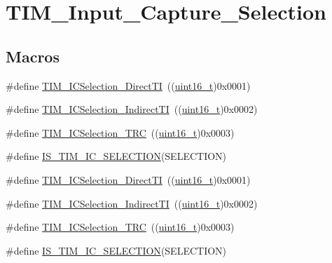 \hypertarget{group___t_i_m___input___capture___selection}{}\section{T\+I\+M\+\_\+\+Input\+\_\+\+Capture\+\_\+\+Selection}
\label{group___t_i_m___input___capture___selection}
\subsection*{Macros}
\begin{DoxyCompactItemize}
\item 
\#define \hyperlink{group___t_i_m___input___capture___selection_ga3d38876044457b7faefe951d367ac8c3}{T\+I\+M\+\_\+\+I\+C\+Selection\+\_\+\+Direct\+TI}~((\hyperlink{_p_e___types_8h_a1f1825b69244eb3ad2c7165ddc99c956}{uint16\+\_\+t})0x0001)
\item 
\#define \hyperlink{group___t_i_m___input___capture___selection_ga2289b684133ac0b81ddfcd860d01b144}{T\+I\+M\+\_\+\+I\+C\+Selection\+\_\+\+Indirect\+TI}~((\hyperlink{_p_e___types_8h_a1f1825b69244eb3ad2c7165ddc99c956}{uint16\+\_\+t})0x0002)
\item 
\#define \hyperlink{group___t_i_m___input___capture___selection_ga2cd464e97ffd6ea3208ec65672f9a373}{T\+I\+M\+\_\+\+I\+C\+Selection\+\_\+\+T\+RC}~((\hyperlink{_p_e___types_8h_a1f1825b69244eb3ad2c7165ddc99c956}{uint16\+\_\+t})0x0003)
\item 
\#define \hyperlink{group___t_i_m___input___capture___selection_ga623d8592109f4702829ae7fc3806bcb8}{I\+S\+\_\+\+T\+I\+M\+\_\+\+I\+C\+\_\+\+S\+E\+L\+E\+C\+T\+I\+ON}(S\+E\+L\+E\+C\+T\+I\+ON)
\item 
\#define \hyperlink{group___t_i_m___input___capture___selection_ga3d38876044457b7faefe951d367ac8c3}{T\+I\+M\+\_\+\+I\+C\+Selection\+\_\+\+Direct\+TI}~((\hyperlink{_p_e___types_8h_a1f1825b69244eb3ad2c7165ddc99c956}{uint16\+\_\+t})0x0001)
\item 
\#define \hyperlink{group___t_i_m___input___capture___selection_ga2289b684133ac0b81ddfcd860d01b144}{T\+I\+M\+\_\+\+I\+C\+Selection\+\_\+\+Indirect\+TI}~((\hyperlink{_p_e___types_8h_a1f1825b69244eb3ad2c7165ddc99c956}{uint16\+\_\+t})0x0002)
\item 
\#define \hyperlink{group___t_i_m___input___capture___selection_ga2cd464e97ffd6ea3208ec65672f9a373}{T\+I\+M\+\_\+\+I\+C\+Selection\+\_\+\+T\+RC}~((\hyperlink{_p_e___types_8h_a1f1825b69244eb3ad2c7165ddc99c956}{uint16\+\_\+t})0x0003)
\item 
\#define \hyperlink{group___t_i_m___input___capture___selection_ga623d8592109f4702829ae7fc3806bcb8}{I\+S\+\_\+\+T\+I\+M\+\_\+\+I\+C\+\_\+\+S\+E\+L\+E\+C\+T\+I\+ON}(S\+E\+L\+E\+C\+T\+I\+ON)
\end{DoxyCompactItemize}


